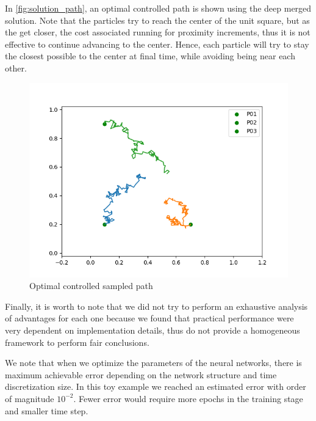   In  \autoref{fig:solution_path}, an optimal controlled path is shown using the deep merged solution. Note that the particles try to reach the center of the unit square, but as the get closer, the cost associated running for proximity increments, thus it is not effective to continue advancing to the center. Hence, each particle will try to stay the closest possible to the center at final time, while avoiding being near each other. 
  \begin{figure}[htb!]		
 		\includegraphics[width=\linewidth]{images/OptimalLQRCentrilized.png}
 		\caption{Optimal controlled sampled path}
 	\label{fig:solution_path}
 \end{figure}
Finally, it is worth to note that we did not try to perform an exhaustive analysis of advantages for each one because we found that practical performance were very dependent on implementation details, thus do not provide a homogeneous framework to perform fair conclusions.


We note that when we optimize the parameters of the neural networks, there is maximum achievable error depending on the network structure and time discretization size. In this toy example we reached an estimated error with order of magnitude $10^{-2}$. Fewer error would require more epochs in the training stage and smaller time step.

